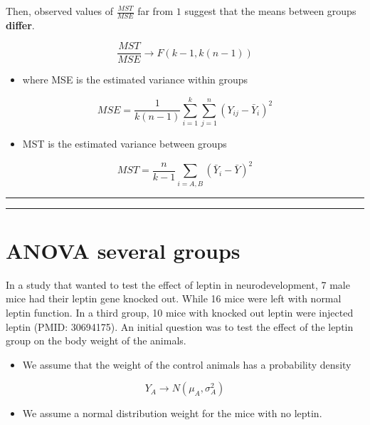 \documentclass[
]{book}
\providecommand{\tightlist}{%
  \setlength{\itemsep}{0pt}\setlength{\parskip}{0pt}}
\begin{document}
Then, observed values of \(\frac{MST}{MSE}\) far from \(1\) suggest that the means between groups \textbf{differ}.

\[\frac{MST}{MSE} \rightarrow F(k-1, k(n-1))\]

\begin{itemize}
\tightlist
\item
  where MSE is the estimated variance within groups
\end{itemize}

\[MSE=\frac{1}{k(n-1)} \sum_{i=1}^k\sum_{j=1}^n(Y_{ij}-\bar{Y}_i)^2\]

\begin{itemize}
\tightlist
\item
  MST is the estimated variance between groups
\end{itemize}

\[MST= \frac{n}{k-1}\sum_{i=A,B}(\bar{Y}_{i}-\bar{Y})^2\]

\begin{center}\rule{0.5\linewidth}{0.5pt}\end{center}

\begin{center}\rule{0.5\linewidth}{0.5pt}\end{center}

\hypertarget{anova-several-groups-2}{%
\section{ANOVA several groups}\label{anova-several-groups-2}}

In a study that wanted to test the effect of leptin in neurodevelopment, 7 male mice had their leptin gene knocked out. While 16 mice were left with normal leptin function. In a third group, 10 mice with knocked out leptin were injected leptin (PMID: 30694175). An initial question was to test the effect of the leptin group on the body weight of the animals.

\begin{itemize}
\tightlist
\item
  We assume that the weight of the control animals has a probability density
\end{itemize}

\[Y_A \rightarrow N(\mu_A, \sigma_A^2)\]

\begin{itemize}
\tightlist
\item
  We assume a normal distribution weight for the mice with no leptin.
\end{itemize}
\end{document}

